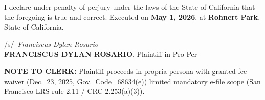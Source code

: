 I declare under penalty of perjury under the laws of the State of California that the foregoing is true and correct. Executed on \textbf{May 1, 2026}, at \textbf{Rohnert Park}, State of California.

\vspace{0.2\baselineskip}
\begin{singlespace}
\begin{flushleft}
/s/\ \textit{Franciscus Dylan Rosario}\\[4pt]
\textbf{FRANCISCUS DYLAN ROSARIO}, Plaintiff in Pro Per
\end{flushleft}\end{singlespace}

\textbf{NOTE TO CLERK:} Plaintiff proceeds in propria persona with granted fee waiver (Dec.\ 23, 2025, Gov.\ Code \textsection~68634(e)) limited mandatory e-file scope (San Francisco LRS rule 2.11 / CRC 2.253(a)(3)).

\vspace{0.35\baselineskip}


